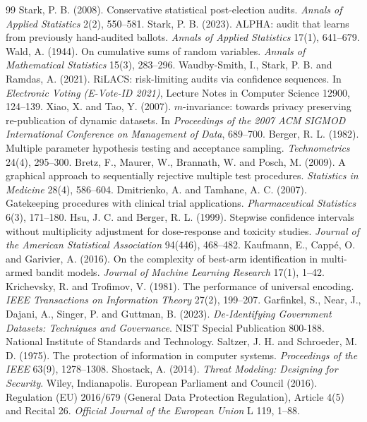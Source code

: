 \documentclass{jpc}
\theoremstyle{remark}
\begin{document}
\begin{thebibliography}{99}
 Stark, P. B. (2008). Conservative statistical post-election audits. \emph{Annals of Applied Statistics} 2(2), 550--581.
 Stark, P. B. (2023). ALPHA: audit that learns from previously hand-audited ballots. \emph{Annals of Applied Statistics} 17(1), 641--679.
 Wald, A. (1944). On cumulative sums of random variables. \emph{Annals of Mathematical Statistics} 15(3), 283--296.
 Waudby-Smith, I., Stark, P. B. and Ramdas, A. (2021). RiLACS: risk-limiting audits via confidence sequences. In \emph{Electronic Voting (E-Vote-ID 2021)}, Lecture Notes in Computer Science 12900, 124--139.
 Xiao, X. and Tao, Y. (2007). $m$-invariance: towards privacy preserving re-publication of dynamic datasets. In \emph{Proceedings of the 2007 ACM SIGMOD International Conference on Management of Data}, 689--700.
 Berger, R. L. (1982). Multiple parameter hypothesis testing and acceptance sampling. \emph{Technometrics} 24(4), 295--300.
 Bretz, F., Maurer, W., Brannath, W. and Posch, M. (2009). A graphical approach to sequentially rejective multiple test procedures. \emph{Statistics in Medicine} 28(4), 586--604.
 Dmitrienko, A. and Tamhane, A. C. (2007). Gatekeeping procedures with clinical trial applications. \emph{Pharmaceutical Statistics} 6(3), 171--180.
 Hsu, J. C. and Berger, R. L. (1999). Stepwise confidence intervals without multiplicity adjustment for dose-response and toxicity studies. \emph{Journal of the American Statistical Association} 94(446), 468--482.
 Kaufmann, E., Capp\'e, O. and Garivier, A. (2016). On the complexity of best-arm identification in multi-armed bandit models. \emph{Journal of Machine Learning Research} 17(1), 1--42.
 Krichevsky, R. and Trofimov, V. (1981). The performance of universal encoding. \emph{IEEE Transactions on Information Theory} 27(2), 199--207.
 Garfinkel, S., Near, J., Dajani, A., Singer, P. and Guttman, B. (2023). \emph{De-Identifying Government Datasets: Techniques and Governance}. NIST Special Publication 800-188. National Institute of Standards and Technology.
 Saltzer, J. H. and Schroeder, M. D. (1975). The protection of information in computer systems. \emph{Proceedings of the IEEE} 63(9), 1278--1308.
 Shostack, A. (2014). \emph{Threat Modeling: Designing for Security}. Wiley, Indianapolis.
 European Parliament and Council (2016). Regulation (EU) 2016/679 (General Data Protection Regulation), Article 4(5) and Recital 26. \emph{Official Journal of the European Union} L 119, 1--88.

\end{thebibliography}
\end{document}
